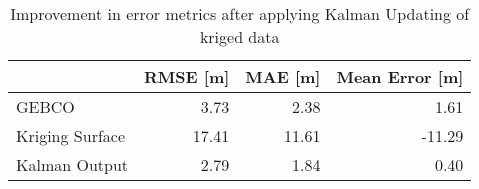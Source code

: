 \begin{table}
\centering
\caption{Improvement in error metrics after applying Kalman Updating of kriged data}
\label{tab:oahu3_gebco_raster_error}
\begin{tabular}{lrrr}
\toprule
 & RMSE [m] & MAE [m] & Mean Error [m] \\
\midrule
GEBCO & 3.73 & 2.38 & 1.61 \\
Kriging Surface & 17.41 & 11.61 & -11.29 \\
Kalman Output & 2.79 & 1.84 & 0.40 \\
\bottomrule
\end{tabular}
\end{table}

